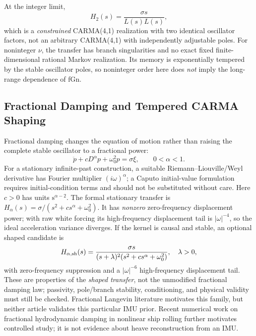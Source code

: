 At the integer limit,
\begin{equation}
H_2(s)=\frac{\sigma s}{L(s)L(s)},
\label{eq:frac-integer}
\end{equation}
which is a \emph{constrained} CARMA(4,1) realization with two identical
oscillator factors, not an arbitrary CARMA(4,1) with independently
adjustable poles. For noninteger \(\nu\), the transfer has branch
singularities and no exact fixed finite-dimensional rational Markov
realization. Its memory is exponentially tempered by the stable
oscillator poles, so noninteger order here does \emph{not} imply the
long-range dependence of fGn.

\subsection{Fractional Damping and Tempered CARMA Shaping}
\label{sec:frac-alternatives}
Fractional damping changes the equation of motion rather than raising
the complete stable oscillator to a fractional power:
\begin{equation}
\ddot p+cD^\alpha p+\omega_0^2p=\sigma\xi,
\qquad 0<\alpha<1.
\label{eq:frac-damping}
\end{equation}
For a stationary infinite-past construction, a suitable
Riemann--Liouville/Weyl derivative has Fourier multiplier
\((i\omega)^\alpha\); a Caputo initial-value formulation requires
initial-condition terms and should not be substituted without care.
Here \(c>0\) has units \(\mathrm{s}^{\alpha-2}\).
The formal stationary transfer is
\(H_\alpha(s)=\sigma/(s^2+cs^\alpha+\omega_0^2)\).
It has \emph{nonzero} zero-frequency displacement power; with raw white
forcing its high-frequency displacement tail is
\(|\omega|^{-4}\), so the ideal acceleration variance diverges.
If the kernel is causal and stable, an optional shaped candidate is
\begin{equation}
H_{\alpha,\rm sh}(s)=
\frac{\sigma s}{(s+\lambda)^2
(s^2+cs^\alpha+\omega_0^2)},\quad \lambda>0,
\label{eq:frac-damped-shaped}
\end{equation}
with zero-frequency suppression and a \(|\omega|^{-6}\)
high-frequency displacement tail. These are properties of the
\emph{shaped transfer}, not the unmodified fractional damping law;
passivity, pole/branch stability, conditioning, and physical validity
must still be checked. Fractional Langevin literature
\cite{lutz01,drozdov07} motivates this family, but neither article
validates this particular IMU prior.
Recent numerical work on fractional hydrodynamic damping in nonlinear
ship rolling \cite{mitseas26} further motivates controlled study;
it is not evidence about heave reconstruction from an IMU.

